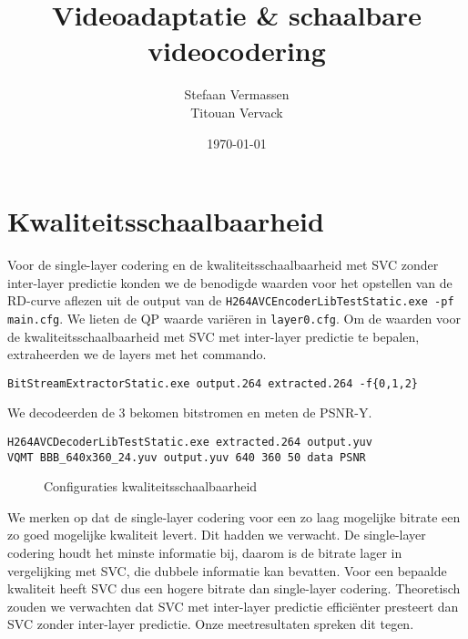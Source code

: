 \documentclass[12pt,a4paper,oneside]{article}
\begin{document}
\title{Videoadaptatie \& schaalbare videocodering}
\author{Stefaan Vermassen \\
	     Titouan Vervack}
\date{\today}
\pagestyle{fancy}
\fancyhf{}
\fancyfoot[C]{\thepage}
\maketitle
\section{Kwaliteitsschaalbaarheid}
Voor de single-layer codering en de kwaliteitsschaalbaarheid met SVC zonder inter-layer predictie konden we de benodigde waarden voor het opstellen van de RD-curve aflezen uit de output van de \verb$H264AVCEncoderLibTestStatic.exe -pf main.cfg$. We lieten de QP waarde vari\"eren in \verb$layer0.cfg$.
Om de waarden voor de kwaliteitsschaalbaarheid met SVC met inter-layer predictie te bepalen, extraheerden we de layers met het commando.
\begin{verbatim}
BitStreamExtractorStatic.exe output.264 extracted.264 -f{0,1,2}
\end{verbatim}
We decodeerden de 3 bekomen bitstromen en meten de PSNR-Y.
\begin{verbatim}
H264AVCDecoderLibTestStatic.exe extracted.264 output.yuv
VQMT BBB_640x360_24.yuv output.yuv 640 360 50 data PSNR
\end{verbatim}
\begin{figure}[H]
  \begin{center}
    
    \caption{Configuraties kwaliteitsschaalbaarheid}
    \label{graph:graph1}
  \end{center}
\end{figure}
We merken op dat de single-layer codering voor een zo laag mogelijke bitrate een zo goed mogelijke kwaliteit levert. Dit hadden we verwacht. De single-layer codering houdt het minste informatie bij, daarom is de bitrate lager in vergelijking met SVC, die dubbele informatie kan bevatten. Voor een bepaalde kwaliteit heeft SVC dus een hogere bitrate dan single-layer codering.
Theoretisch zouden we verwachten dat SVC met inter-layer predictie effici\"enter presteert dan SVC zonder inter-layer predictie. Onze meetresultaten spreken dit tegen.
\end{document}
